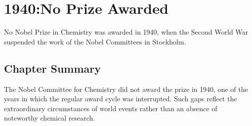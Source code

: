 \chapter{1940:No Prize Awarded}
\label{chap:chemistry1940}

No Nobel Prize in Chemistry was awarded in 1940, when the Second World War suspended the work of the Nobel Committees in Stockholm.

\section*{Chapter Summary}

The Nobel Committee for Chemistry did not award the prize in 1940, one of the years in which the regular award cycle was interrupted. Such gaps reflect the extraordinary circumstances of world events rather than an absence of noteworthy chemical research.
